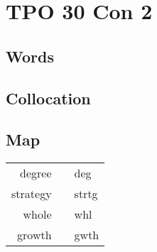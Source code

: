 \section{TPO 30 Con 2}

\subsection{Words}

\subsection{Collocation}

\subsection{Map}

\begin{tabular}{rc@{\quad$\to$\quad}l}
    degree   &  & deg   \\
    strategy &  & strtg \\
    whole    &  & whl   \\
    growth   &  & gwth  \\
\end{tabular}

